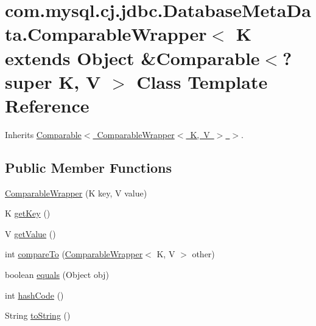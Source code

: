 \hypertarget{classcom_1_1mysql_1_1cj_1_1jdbc_1_1_database_meta_data_1_1_comparable_wrapper}{}\section{com.\+mysql.\+cj.\+jdbc.\+Database\+Meta\+Data.\+Comparable\+Wrapper$<$ K extends Object \&Comparable$<$? super K, V $>$ Class Template Reference}
\label{classcom_1_1mysql_1_1cj_1_1jdbc_1_1_database_meta_data_1_1_comparable_wrapper}


Inherits \mbox{\hyperlink{class_comparable}{Comparable$<$ Comparable\+Wrapper$<$ K, V $>$ $>$}}.

\subsection*{Public Member Functions}
\begin{DoxyCompactItemize}
\item 
\mbox{\hyperlink{classcom_1_1mysql_1_1cj_1_1jdbc_1_1_database_meta_data_1_1_comparable_wrapper_a1653def55a268306f8d279ff25a19110}{Comparable\+Wrapper}} (K key, V value)
\item 
K \mbox{\hyperlink{classcom_1_1mysql_1_1cj_1_1jdbc_1_1_database_meta_data_1_1_comparable_wrapper_a1550881e84017a0e76aa63f2b8cff9ec}{get\+Key}} ()
\item 
V \mbox{\hyperlink{classcom_1_1mysql_1_1cj_1_1jdbc_1_1_database_meta_data_1_1_comparable_wrapper_aee795cd02f0c591e17c0f2503c8a516a}{get\+Value}} ()
\item 
int \mbox{\hyperlink{classcom_1_1mysql_1_1cj_1_1jdbc_1_1_database_meta_data_1_1_comparable_wrapper_a6665c44dd7f81f01f3ebb7adba896ab7}{compare\+To}} (\mbox{\hyperlink{classcom_1_1mysql_1_1cj_1_1jdbc_1_1_database_meta_data_1_1_comparable_wrapper}{Comparable\+Wrapper}}$<$ K, V $>$ other)
\item 
boolean \mbox{\hyperlink{classcom_1_1mysql_1_1cj_1_1jdbc_1_1_database_meta_data_1_1_comparable_wrapper_ac2ed5e9c2ac526e5a33a78ae550ac3fa}{equals}} (Object obj)
\item 
int \mbox{\hyperlink{classcom_1_1mysql_1_1cj_1_1jdbc_1_1_database_meta_data_1_1_comparable_wrapper_af28f4596fd8a490178482dea72336cfc}{hash\+Code}} ()
\item 
String \mbox{\hyperlink{classcom_1_1mysql_1_1cj_1_1jdbc_1_1_database_meta_data_1_1_comparable_wrapper_a509b8dedeee279d61db71f16c39dd452}{to\+String}} ()
\end{DoxyCompactItemize}


